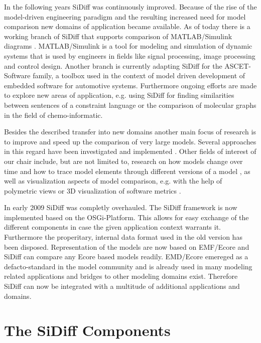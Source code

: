 \documentclass{article}
\begin{document}
In the following years SiDiff was continuously improved. Because of the rise of the model-driven engineering paradigm and 
the resulting increased need for model comparison new domains of application became available. 
As of today there is a working branch of SiDiff that supports comparison of MATLAB/Simulink diagrams \cite{Kel07Mate, Sch08ConsDiff}. MATLAB/Simulink 
is a tool for modeling and simulation of dynamic systems that is used by engineers in fields like signal processing, image 
processing and control design. Another branch is currently adapting SiDiff for the ASCET-Software family, a toolbox 
used in the context of model driven development of embedded software for automotive systems. Furthermore ongoing efforts are made to 
explore new areas of application, e.g. using SiDiff for finding similarities between sentences of a constraint language \cite{Bild09SoftRe} or the 
comparison of molecular graphs \cite{Gra08MolGra} in the field of chemo-informatic.      

Besides the described transfer into new domains another main focus of research is to improve and speed up the comparison of 
very large models. Several approaches in this regard have been investigated and implemented \cite{Tre07DiffComp, Pie08FP}. Other fields of 
interest of our chair include, but are not limited to, research on how models change over time and how to trace model elements through different versions 
of a model \cite{Wen08ModEvu}, as well as visualization aspects of model comparison, e.g. with the help of polymetric views \cite{Wen08ScaVis} or 
3D visualization of software metrics \cite{Koch09, Wenzel09}.

In early 2009 SiDiff was completly overhauled. The SiDiff framework is now implemented based on the OSGi-Platform. This 
allows for easy exchange of the different components in case the given application context warrants it. Furthermore the 
properitary, internal data format used in the old version has been disposed. Representation of the models are now based on EMF/Ecore and SiDiff can compare any 
Ecore based models readily. EMD/Ecore emereged as a defacto-standard in the model community and is already used in many modeling related applications 
and bridges to other modeling domains exist. Therefore SiDiff can now be integrated with a multitude of additional applications and domains.  
 

\section{The SiDiff Components}
\label{secsidiffcomps}
\end{document}
